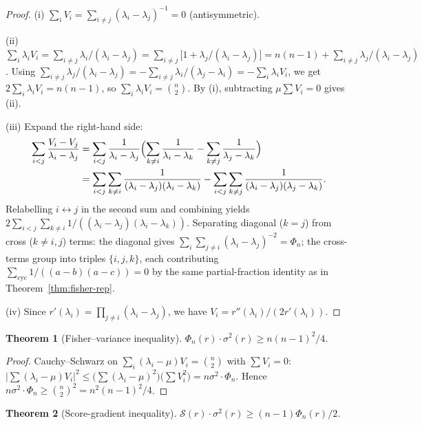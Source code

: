 \documentclass[10pt,a4paper]{amsart}
\theoremstyle{plain}
\newtheorem{theorem}{Theorem}[section]
\theoremstyle{definition}
\theoremstyle{remark}
\begin{document}
\begin{proof}
(i) $\sum_i V_i=\sum_{i\ne j}(\lambda_i-\lambda_j)^{-1}=0$ (antisymmetric).

(ii) $\sum_i\lambda_i V_i=\sum_{i\ne j}\lambda_i/(\lambda_i-\lambda_j)
=\sum_{i\ne j}\bigl[1+\lambda_j/(\lambda_i-\lambda_j)\bigr]
=n(n-1)+\sum_{i\ne j}\lambda_j/(\lambda_i-\lambda_j)$.
Using $\sum_{i\ne j}\lambda_j/(\lambda_i-\lambda_j)
=-\sum_{i\ne j}\lambda_i/(\lambda_j-\lambda_i)
=-\sum_i\lambda_i V_i$,
we get $2\sum_i\lambda_i V_i=n(n-1)$,
so $\sum_i\lambda_i V_i=\binom{n}{2}$.
By (i), subtracting $\mu\sum V_i=0$ gives (ii).

(iii) Expand the right-hand side:
\begin{align*}
  \sum_{i<j}\frac{V_i-V_j}{\lambda_i-\lambda_j}
  &=\sum_{i<j}\frac{1}{\lambda_i-\lambda_j}
    \Bigl(\sum_{k\ne i}\frac{1}{\lambda_i-\lambda_k}
    -\sum_{k\ne j}\frac{1}{\lambda_j-\lambda_k}\Bigr)\\
  &=\sum_{i<j}\sum_{k\ne i}\frac{1}{(\lambda_i-\lambda_j)(\lambda_i-\lambda_k)}
    -\sum_{i<j}\sum_{k\ne j}\frac{1}{(\lambda_i-\lambda_j)(\lambda_j-\lambda_k)}.
\end{align*}
Relabelling $i\leftrightarrow j$ in the second sum and combining yields
$2\sum_{i<j}\sum_{k\ne i}1/((\lambda_i-\lambda_j)(\lambda_i-\lambda_k))$.
Separating diagonal ($k=j$) from cross ($k\ne i,j$) terms:
the diagonal gives $\sum_i\sum_{j\ne i}(\lambda_i-\lambda_j)^{-2}=\Phi_n$;
the cross-terms group into triples $\{i,j,k\}$, each contributing
$\sum_{\mathrm{cyc}}1/((a-b)(a-c))=0$
by the same partial-fraction identity as in Theorem~\ref{thm:fisher-rep}.

(iv) Since $r'(\lambda_i)=\prod_{j\ne i}(\lambda_i-\lambda_j)$, we have $V_i=r''(\lambda_i)/(2r'(\lambda_i))$.
\end{proof}

\begin{theorem}[Fisher--variance inequality]
\label{thm:fisher-var}
$\Phi_n(r)\cdot\sigma^2(r)\ge n(n-1)^2/4$.
\end{theorem}

\begin{proof}
Cauchy--Schwarz on
$\sum_i(\lambda_i-\mu)V_i=\binom{n}{2}$
with $\sum V_i=0$:
$\bigl|\sum(\lambda_i-\mu)V_i\bigr|^2
\le\bigl(\sum(\lambda_i-\mu)^2\bigr)\bigl(\sum V_i^2\bigr)
=n\sigma^2\cdot\Phi_n$.
Hence $n\sigma^2\cdot\Phi_n\ge\binom{n}{2}^2=n^2(n-1)^2/4$.
\end{proof}

\begin{theorem}[Score-gradient inequality]
\label{thm:sgi}
$\mathcal{S}(r)\cdot\sigma^2(r)\ge(n-1)\Phi_n(r)/2$.
\end{theorem}
\end{document}
